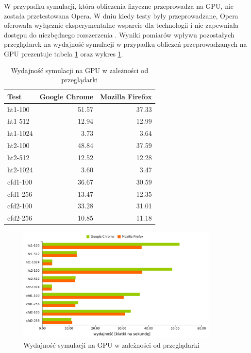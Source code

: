 W przypadku symulacji, która obliczenia fizyczne przeprowadza na GPU, nie
została przetestowana Opera.  W dniu kiedy testy były przeprowadzane, Opera
oferowała wyłącznie eksperymentalne wsparcie dla technologii  i nie
zapewniała dostępu do niezbędnego rozszerzenia . Wyniki
pomiarów wpływu pozostałych przeglądarek na wydajność symulacji w przypadku
obliczeń przeprowadzanych na GPU prezentuje tabela \ref{tab:przegladarkiGPU}
oraz wykres \ref{fig:browserPerfGPU}.

\begin{table}[H]
\caption{Wydajność symulacji na GPU w zależności od przeglądarki}
\centering
\begin{tabular}{|l|r|r|}
\hline
Test & Google Chrome & Mozilla Firefox \\ \hline
ht1-100 & 51.57 & 37.33 \\ \hline
ht1-512 & 12.94 & 12.99 \\ \hline
ht1-1024 & 3.73 & 3.64 \\ \hline
ht2-100 & 48.84 & 37.59 \\ \hline
ht2-512 & 12.52 & 12.28 \\ \hline
ht2-1024 & 3.60 & 3.47 \\ \hline
\hline
cfd1-100 & 36.67 & 30.59 \\ \hline
cfd1-256 & 13.47 & 12.35 \\ \hline
cfd2-100 & 33.28 & 31.01 \\ \hline
cfd2-256 & 10.85 & 11.18 \\ \hline
\end{tabular}
\label{tab:przegladarkiGPU}
\end{table}

\begin{figure}[H]
\centering
\includegraphics[width=0.9\textwidth]{img/browserPerfGPU}
\caption{Wydajność symulacji na GPU w zależności od przeglądarki}
\label{fig:browserPerfGPU}
\end{figure}

